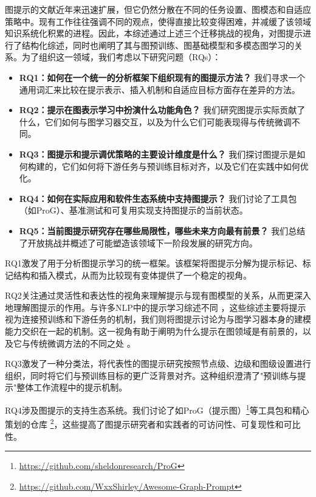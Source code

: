 图提示的文献近年来迅速扩展，但它仍然分散在不同的任务设置、图模态和自适应策略中。现有工作往往强调不同的观点，使得直接比较变得困难，并减缓了该领域知识系统化积累的进程。因此，本综述通过上述三个迁移挑战的视角，对图提示进行了结构化综述，同时也阐明了其与图预训练、图基础模型和多模态图学习的关系。为了组织这一领域，我们考虑以下研究问题（RQs）：

\begin{itemize}
    \item \textbf{RQ1：如何在一个统一的分析框架下组织现有的图提示方法？} 我们寻求一个通用词汇来比较在提示表示、插入机制和自适应目标方面存在差异的方法。
    \item  \textbf{RQ2：提示在图表示学习中扮演什么功能角色？} 我们研究图提示实际贡献了什么，它们如何与图学习器交互，以及为什么它们可能表现得与传统微调不同。


    \item  \textbf{RQ3：图提示和提示调优策略的主要设计维度是什么？} 我们探讨图提示是如何构建的，它们如何将下游任务与预训练目标对齐，以及它们在实践中如何优化。





    \item  \textbf{RQ4：如何在实际应用和软件生态系统中支持图提示？} 我们讨论了工具包（如ProG）、基准测试和可复用实现支持图提示的当前状态。

    \item  \textbf{RQ5：当前图提示研究存在哪些局限性，哪些未来方向最有前景？} 我们总结了开放挑战并概述了可能塑造该领域下一阶段发展的研究方向。


\end{itemize}




RQ1激发了用于分析图提示学习的统一框架。该框架将图提示分解为提示标记、标记结构和插入模式，从而为比较现有变体提供了一个稳定的视角。


RQ2关注通过灵活性和表达性的视角来理解提示与现有图模型的关系，从而更深入地理解图提示的作用。与许多NLP中的提示学习综述不同 \cite{liu2023pretrain}，这些综述主要将提示视为连接预训练和下游任务的机制，我们则将图提示讨论为与图学习器本身的建模能力交织在一起的机制。这一视角有助于阐明为什么提示在图领域是有前景的，以及它与传统微调方法的不同之处 \cite{hu2020strategies}。


RQ3激发了一种分类法，将代表性的图提示研究按照节点级、边级和图级设置进行组织，同时将它们与预训练目标的更广泛背景对齐。这种组织澄清了"预训练与提示"整体工作流程中的提示机制。

RQ4涉及图提示的支持生态系统。我们讨论了如ProG（提示图）\footnote{\url{https://github.com/sheldonresearch/ProG}}等工具包和精心策划的仓库 \footnote{\url{https://github.com/WxxShirley/Awesome-Graph-Prompt}}，这些提高了图提示研究者和实践者的可访问性、可复现性和可比性。

